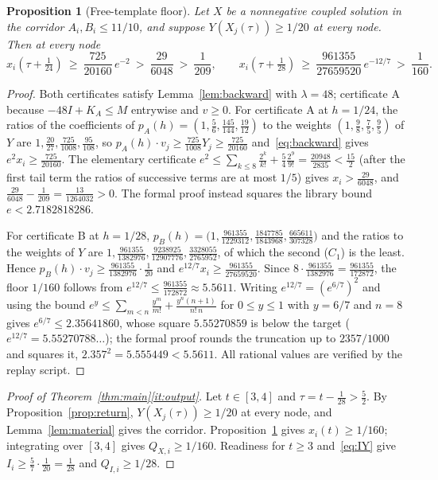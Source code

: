 \documentclass[11pt,a4paper]{article}
\theoremstyle{plain}
\newtheorem{proposition}[theorem]{Proposition}
\theoremstyle{definition}
\theoremstyle{remark}
\newcommand{\Iv}{I}
\begin{document}
\begin{proposition}[Free-template floor]\label{prop:floor}
Let $X$ be a nonnegative coupled solution in the corridor $A_i,B_i\le11/10$, and suppose $Y(X_j(\tau))\ge1/20$ at every node. Then at every node
\begin{equation}\label{eq:floors}
x_i(\tau+\tfrac1{24})\ \ge\ \frac{725}{20160}\,e^{-2}\ >\ \frac{29}{6048}\ >\ \frac1{209},\qquad
x_i(\tau+\tfrac1{28})\ \ge\ \frac{961355}{27659520}\,e^{-12/7}\ >\ \frac1{160}.
\end{equation}
\end{proposition}
\begin{proof}
Both certificates satisfy Lemma~\ref{lem:backward} with $\lambda=48$; certificate A because $-48I+K_A\le M$ entrywise and $v\ge0$. For certificate A at $h=1/24$, the ratios of the coefficients of $p_A(h)=(1,\frac56,\frac{145}{144},\frac{19}{12})$ to the weights $(1,\frac98,\frac75,\frac95)$ of $Y$ are $1,\frac{20}{27},\frac{725}{1008},\frac{95}{108}$, so $p_A(h)\cdot v_j\ge\frac{725}{1008}Y_j\ge\frac{725}{20160}$ and~\eqref{eq:backward} gives $e^2x_i\ge\frac{725}{20160}$. The elementary certificate $e^2\le\sum_{k\le8}\frac{2^k}{k!}+\frac54\frac{2^9}{9!}=\frac{20948}{2835}<\frac{15}2$ (after the first tail term the ratios of successive terms are at most $1/5$) gives $x_i>\frac{29}{6048}$, and $\frac{29}{6048}-\frac1{209}=\frac{13}{1264032}>0$. The formal proof instead squares the library bound $e<2.7182818286$.

For certificate B at $h=1/28$, $p_B(h)=\bigl(1,\frac{961355}{1229312},\frac{1847785}{1843968},\frac{665611}{307328}\bigr)$ and the ratios to the weights of $Y$ are $1,\frac{961355}{1382976},\frac{9238925}{12907776},\frac{3328055}{2765952}$, of which the second ($C_1$) is the least. Hence $p_B(h)\cdot v_j\ge\frac{961355}{1382976}\cdot\frac1{20}$ and $e^{12/7}x_i\ge\frac{961355}{27659520}$. Since $8\cdot\frac{961355}{1382976}=\frac{961355}{172872}$, the floor $1/160$ follows from $e^{12/7}\le\frac{961355}{172872}\approx5.5611$. Writing $e^{12/7}=(e^{6/7})^2$ and using the bound $e^{y}\le\sum_{m<n}\frac{y^m}{m!}+\frac{y^n(n+1)}{n!\,n}$ for $0\le y\le1$ with $y=6/7$ and $n=8$ gives $e^{6/7}\le2.35641860$, whose square $5.55270859$ is below the target ($e^{12/7}=5.55270788\ldots$); the formal proof rounds the truncation up to $2357/1000$ and squares it, $2.357^2=5.555449<5.5611$. All rational values are verified by the replay script.
\end{proof}

\begin{proof}[Proof of Theorem~\ref{thm:main}\ref{it:output}]
Let $t\in[3,4]$ and $\tau=t-\frac1{28}>\frac52$. By Proposition~\ref{prop:return}, $Y(X_j(\tau))\ge1/20$ at every node, and Lemma~\ref{lem:material} gives the corridor. Proposition~\ref{prop:floor} gives $x_i(t)\ge1/160$; integrating over $[3,4]$ gives $Q_{X,i}\ge1/160$. Readiness for $t\ge3$ and~\eqref{eq:IY} give $\Iv_i\ge\frac57\cdot\frac1{20}=\frac1{28}$ and $Q_{\Iv,i}\ge1/28$.
\end{proof}
\end{document}
